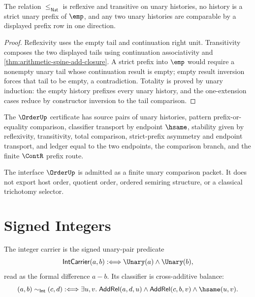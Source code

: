 \begin{theorem}
\label{thm:arithmetic-spine-unary-prefix-order-rows}
The relation $\le_{\mathsf{Nat}}$ is reflexive and transitive on unary
histories, no history is a strict unary prefix of $\emp$, and any two unary
histories are comparable by a displayed prefix row in one direction.
\end{theorem}

\begin{proof}
Reflexivity uses the empty tail and continuation right unit.  Transitivity
composes the two displayed tails using continuation associativity and
\autoref{thm:arithmetic-spine-add-closure}.  A strict prefix into $\emp$
would require a nonempty unary tail whose continuation result is empty; empty
result inversion forces that tail to be empty, a contradiction.  Totality is
proved by unary induction: the empty history prefixes every unary history,
and the one-extension cases reduce by constructor inversion to the tail
comparison.
\end{proof}

\begin{definition}
\label{def:arithmetic-spine-order-namecert}
The $\OrderUp$ certificate has source pairs of unary histories, pattern
prefix-or-equality comparison, classifier transport by endpoint $\hsame$,
stability given by reflexivity, transitivity, total comparison, strict-prefix
asymmetry and endpoint transport, and ledger equal to the two endpoints, the
comparison branch, and the finite $\ContR$ prefix route.
\end{definition}

\begin{corollary}
\label{cor:arithmetic-spine-order-admission}
The interface $\OrderUp$ is admitted as a finite unary comparison packet.  It
does not export host order, quotient order, ordered semiring structure, or a
classical trichotomy selector.
\end{corollary}

\section{Signed Integers}
\label{sec:arithmetic-spine-int}

\begin{definition}
\label{def:arithmetic-spine-int-carrier-classifier}
The integer carrier is the signed unary-pair predicate
$$
\mathsf{IntCarrier}(a,b)
:\Longleftrightarrow
\Unary(a)\wedge\Unary(b),
$$
read as the formal difference $a-b$.  Its classifier is cross-additive
balance:
$$
(a,b)\sim_{\mathsf{Int}}(c,d)
:\Longleftrightarrow
\exists u,v.\;
\mathsf{AddRel}(a,d,u)\wedge
\mathsf{AddRel}(c,b,v)\wedge
\hsame(u,v).
$$
\end{definition}

